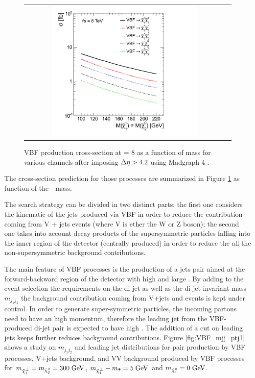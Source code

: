 \begin{figure}[tbh!]
	\centering
	\begin{tabular}{cc}
		\includegraphics[width=0.75\textwidth]{analysis/pics/VBFXsection.png}
	\end{tabular}
	\caption{VBF production cross-section at \CM = 8 \tev as a function of mass for various channels after imposing \ensuremath{\deltaeta > 4.2} using Madgraph 4 \cite{Dutta:2012xe}.}
	\label{fig:VBF_xsec}
\end{figure}

The cross-section prediction for those processes are summarized in Figure \ref{fig:VBF_xsec} as function of the \charginomp - \neutralinotwo mass.

The search strategy can be divided in two distinct parts: the first one considers the kinematic of the jets produced via VBF in order to reduce the contribution coming  from V + jets events (where V is ether the W or Z boson); the second one takes into account decay products of the supersymmetric particles falling into the inner region of the detector (centrally produced) in order to reduce the all the non-supersymmetric background contributions.

The main feature of VBF processes is the production of a jets pair aimed at the forward-backward region of the detector with high \pt and large \deltaeta. By adding to the event selection the requirements on the di-jet \deltaeta as well as the di-jet invariant mass \ensuremath{m_{j_{1}j_{2}}} the background contribution coming from V+jets and \ttbar events is kept under control. In order to generate super-symmetric particles, the incoming partons need to have an high momentum, therefore the leading jet from the VBF-produced di-jet pair is expected to have high \pt. The addition of a \pt cut on leading jets keeps further reduces background contributions. Figure \ref{fig:VBF_mjj_ptj1} shows a study on \ensuremath{m_{j_{1}j_{2}}} and leading jet \pt distributions for \charginopm \charginopm pair production by VBF processes, V+jets background, and VV background produced by VBF processes for \ensuremath{m_{\charginopm} = m_{\neutralinotwo} = 300\gev}, \ensuremath{m_{\charginopm} - m_{\tilde{\tau}} = 5\gev} and \ensuremath{m_{\neutralinoone} = 0\gev}.

